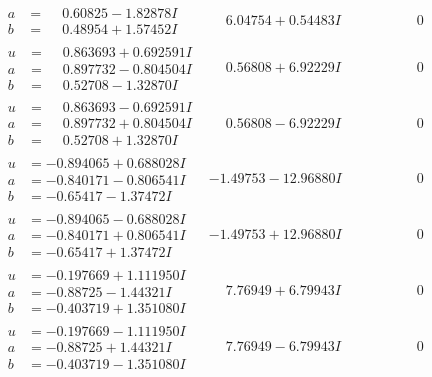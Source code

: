 \documentclass[1p]{elsarticle_modified}
\theoremstyle{definition}
\begin{document}
$$\begin{array}{c|c|c}
\begin{aligned}
a &= \phantom{-}0.60825 - 1.82878 I \\
b &= \phantom{-}0.48954 + 1.57452 I\end{aligned}
 & \phantom{-}6.04754 + 0.54483 I & \phantom{-0.000000 } 0 \\ \hline\begin{aligned}
u &= \phantom{-}0.863693 + 0.692591 I \\
a &= \phantom{-}0.897732 - 0.804504 I \\
b &= \phantom{-}0.52708 - 1.32870 I\end{aligned}
 & \phantom{-}0.56808 + 6.92229 I & \phantom{-0.000000 } 0 \\ \hline\begin{aligned}
u &= \phantom{-}0.863693 - 0.692591 I \\
a &= \phantom{-}0.897732 + 0.804504 I \\
b &= \phantom{-}0.52708 + 1.32870 I\end{aligned}
 & \phantom{-}0.56808 - 6.92229 I & \phantom{-0.000000 } 0 \\ \hline\begin{aligned}
u &= -0.894065 + 0.688028 I \\
a &= -0.840171 - 0.806541 I \\
b &= -0.65417 - 1.37472 I\end{aligned}
 & -1.49753 - 12.96880 I & \phantom{-0.000000 } 0 \\ \hline\begin{aligned}
u &= -0.894065 - 0.688028 I \\
a &= -0.840171 + 0.806541 I \\
b &= -0.65417 + 1.37472 I\end{aligned}
 & -1.49753 + 12.96880 I & \phantom{-0.000000 } 0 \\ \hline\begin{aligned}
u &= -0.197669 + 1.111950 I \\
a &= -0.88725 - 1.44321 I \\
b &= -0.403719 + 1.351080 I\end{aligned}
 & \phantom{-}7.76949 + 6.79943 I & \phantom{-0.000000 } 0 \\ \hline\begin{aligned}
u &= -0.197669 - 1.111950 I \\
a &= -0.88725 + 1.44321 I \\
b &= -0.403719 - 1.351080 I\end{aligned}
 & \phantom{-}7.76949 - 6.79943 I & \phantom{-0.000000 } 0\\

\end{array}$$
\end{document}
